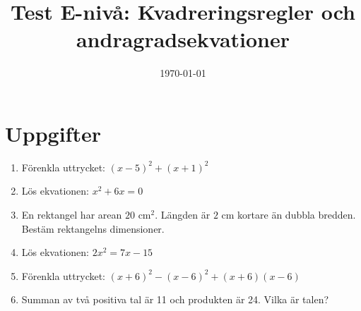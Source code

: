 \documentclass[12pt]{article}
\title{Test E-nivå: Kvadreringsregler och andragradsekvationer}
\author{ }
\date{\today}
\begin{document}
\maketitle

\section*{Uppgifter}
\begin{enumerate}[label=\textbf{\arabic*.}]
    \item Förenkla uttrycket: $(x-5)^2 + (x+1)^2$

    \item Lös ekvationen: $x^2 + 6x = 0$

    \item En rektangel har arean $20\text{ cm}^2$. Längden är $2\text{ cm}$ kortare än dubbla bredden. Bestäm rektangelns dimensioner.

    \item Lös ekvationen: $2x^2 = 7x - 15$

    \item Förenkla uttrycket: $(x+6)^2 - (x-6)^2 + (x+6)(x-6)$

    \item Summan av två positiva tal är 11 och produkten är 24. Vilka är talen?
\end{enumerate}

\newpage
\end{document}
